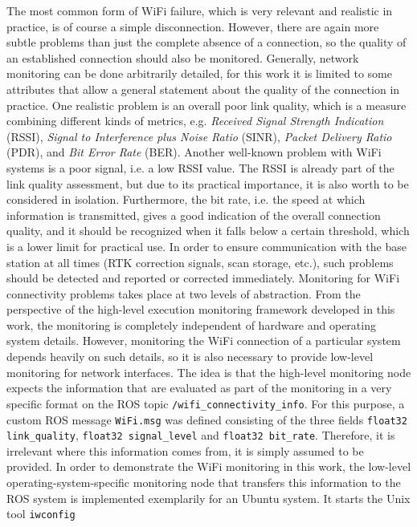 \documentclass[english, master, utf8]{base/thesis_KBS}
\newcommand{\code}[1]{\colorbox{light-gray}{\texttt{#1}}}
\begin{document}
The most common form of WiFi failure, which is very relevant and realistic in practice, is of course a simple disconnection.
However, there are again more subtle problems than just the complete absence of a connection, so the quality of an established connection should also be monitored.
Generally, network monitoring can be done arbitrarily detailed, for this work it is limited to some attributes that allow a general statement about the quality of
the connection in practice. One realistic problem is an overall poor link quality, which is a measure combining different kinds of metrics, e.g.
\textit{Received Signal Strength Indication} (RSSI), \textit{Signal to Interference plus Noise Ratio} (SINR), \textit{Packet Delivery Ratio} (PDR), and
\textit{Bit Error Rate} (BER). \cite{Vlavianos:2008} Another well-known problem with WiFi systems is a poor signal, i.e. a low RSSI value. The RSSI is already part of
the link quality assessment, but due to its practical importance, it is also worth to be considered in isolation. Furthermore, the bit rate, i.e. the speed at which
information is transmitted, gives a good indication of the overall connection quality, and it should be recognized when it falls below a certain threshold, which is a
lower limit for practical use. In order to ensure communication with the base station at all times (RTK correction signals, scan storage, etc.), such problems should be
detected and reported or corrected immediately.\newline
Monitoring for WiFi connectivity problems takes place at two levels of abstraction. From the perspective of the high-level execution monitoring framework developed in this work,
the monitoring is completely independent of hardware and operating system details. However, monitoring the WiFi connection of a particular system depends heavily on such details,
so it is also necessary to provide low-level monitoring for network interfaces. The idea is that the high-level monitoring node expects the information that are evaluated as part 
of the monitoring in a very specific format on the ROS topic \code{/wifi\_connectivity\_info}. For this purpose, a custom ROS message \code{WiFi.msg} was defined consisting of the
three fields \code{float32 link\_quality}, \code{float32 signal\_level} and \code{float32 bit\_rate}. Therefore, it is irrelevant where this information comes from, it is simply
assumed to be provided. In order to demonstrate the WiFi monitoring in this work, the low-level operating-system-specific monitoring node that transfers this
information to the ROS system is implemented exemplarily for an Ubuntu system. It starts the Unix tool \code{iwconfig}
\end{document}
